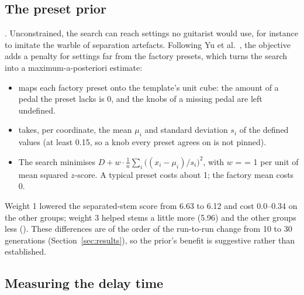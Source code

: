 \subsection{The preset prior}
\label{sec:impl-prior}

 \done. Unconstrained, the search can reach settings no
guitarist would use, for instance to imitate the warble of separation
artefacts. Following Yu et al.~\cite{yu2025improving}, the objective adds a
penalty for settings far from the factory presets, which turns the search into a
maximum-a-posteriori estimate:
\begin{itemize}
\item {} maps each factory preset onto the template's
  unit cube: the amount of a pedal the preset lacks is 0, and the knobs of a
  missing pedal are left undefined.
\item {} takes, per coordinate, the mean $\mu_i$ and standard
  deviation $s_i$ of the defined values (at least 0.15, so a knob every preset
  agrees on is not pinned).
\item The search minimises $D + w \cdot \frac{1}{n}\sum_i \bigl((x_i - \mu_i)/s_i\bigr)^2$,
  with $w$ =  = 1\dB{} per unit of mean squared
  $z$-score. A typical preset costs about 1\dB; the factory mean costs 0.
\end{itemize}
Weight 1 lowered the separated-stem score from 6.63 to 6.12\dB{} and cost
0.0--0.34\dB{} on the other groups; weight 3 helped stems a little more (5.96)
and the other groups less \measured{} (). These differences
are of the order of the run-to-run change from 10 to 30 generations
(Section~\ref{sec:results}), so the prior's benefit is suggestive rather than
established.

\subsection{Measuring the delay time}
\label{sec:impl-delay}

